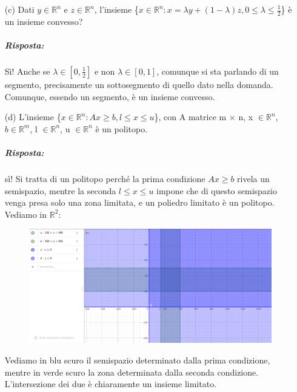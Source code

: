 \begin{itemize}
    \item[(c)] Dati $y \in \mathbb{R}^n$ e $z \in \mathbb{R}^n$, l'insieme \{$x \in \mathbb{R}^n: x = \lambda y + (1 - \lambda)z, 0 \leq \lambda \leq \frac{1}{2}$\} è un insieme convesso?
    
    \subparagraph{Risposta:} Sì! Anche se $\lambda \in [0, \frac{1}{2}]$ e non $\lambda \in [0,1]$, comunque si sta parlando di un segmento, precisamente un sottosegmento di quello dato nella domanda. Comunque, essendo un segmento, è un insieme convesso.
    
    
    \item[(d)] L'insieme \{$x \in \mathbb{R}^n: Ax \geq b, l \leq x \leq u$\}, con A matrice m $\times$ n, x $\in \mathbb{R}^n$, $b \in \mathbb{R}^m$, l $\in \mathbb{R}^n$, u $\in \mathbb{R}^n$ è un politopo.
    
    \subparagraph{Risposta:} sì! Si tratta di un politopo perché la prima condizione $Ax \geq b$ rivela un semispazio, mentre la seconda $l \leq x \leq u$ impone che di questo semispazio venga presa solo una zona limitata, e un poliedro limitato è un politopo. Vediamo in $\mathbb{R}^2$:
    \begin{figure}[h!]
        \centering
        \includegraphics[scale=0.3]{geogebrapolitopi.png}
    \end{figure}
    Vediamo in blu scuro il semispazio determinato dalla prima condizione, mentre in verde scuro la zona determinata dalla seconda condizione. L'intersezione dei due è chiaramente un insieme limitato.
\end{itemize}


